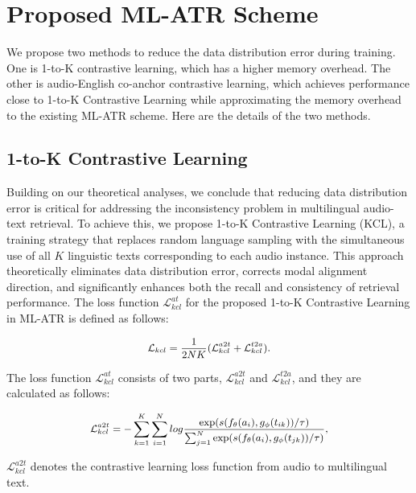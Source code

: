 \section{Proposed ML-ATR Scheme}
We propose two methods to reduce the data distribution error during training. One is 1-to-K contrastive learning, which has a higher memory overhead. The other is audio-English co-anchor contrastive learning, which achieves performance close to 1-to-K Contrastive Learning while approximating the memory overhead to the existing ML-ATR scheme. Here are the details of the two methods.

\subsection{1-to-K Contrastive Learning}
Building on our theoretical analyses, we conclude that reducing data distribution error is critical for addressing the inconsistency problem in multilingual audio-text retrieval. To achieve this, we propose 1-to-K Contrastive Learning (KCL), a training strategy that replaces random language sampling with the simultaneous use of all $K$ linguistic texts corresponding to each audio instance. This approach theoretically eliminates data distribution error, corrects modal alignment direction, and significantly enhances both the recall and consistency of retrieval performance. The loss function $\mathcal{L}^{at}_{kcl}$ for the proposed 1-to-K Contrastive Learning in ML-ATR is defined as follows:

\begin{equation}
\small
\begin{aligned}
\mathcal{L}_{kcl}=\frac{1}{2NK}(\mathcal{L}^{a2t}_{kcl}+\mathcal{L}^{t2a}_{kcl}).
\end{aligned}
\end{equation}

The loss function $\mathcal{L}^{at}_{kcl}$ consists of two parts, $\mathcal{L}^{a2t}_{kcl}$ and $\mathcal{L}^{t2a}_{kcl}$, and they are calculated as follows:

\begin{equation}
\small
\begin{aligned}
\mathcal{L}^{a2t}_{kcl}=-\sum^K_{k=1}\sum^N_{i=1}log\frac{\exp(s(f_\theta(a_i),g_\phi(t_{ik}))/\tau)}{\sum^N_{j=1}\exp(s(f_\theta(a_i),g_\phi(t_{jk}))/\tau)},
\end{aligned}
\end{equation}

$\mathcal{L}^{a2t}_{kcl}$ denotes the contrastive learning loss function from audio to multilingual text.

